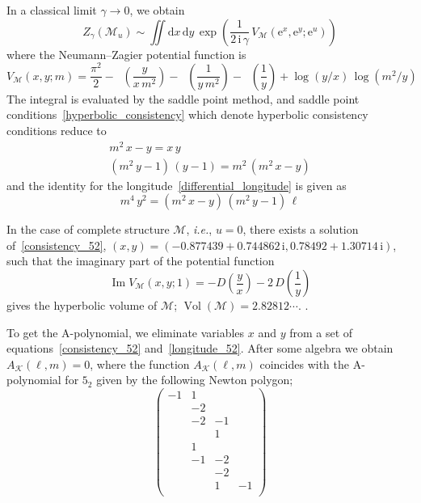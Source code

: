 \documentclass[12pt,reqno]{amsart}
\numberwithin{equation}{section}
\renewcommand{\Im}{\operatorname{Im}}
\DeclareMathOperator{\Li}{Li_2}
\DeclareMathOperator{\Vol}{Vol}
\newcommand{\I}{\mathrm{i}}
\newcommand{\E}{\mathrm{e}}
\begin{document}
In a classical limit $\gamma\to 0$, we obtain
\begin{equation}
  Z_\gamma\left( \mathcal{M}_u \right)
  \sim
  \iint \mathrm{d} x \, \mathrm{d} y \,
  \exp 
  \left(
    \frac{1}{2 \, \I \, \gamma} \,
    V_{\mathcal{M}}(\E^x, \E^y ; \E^u)
  \right)
\end{equation}
where the Neumann--Zagier potential function is
  \begin{equation}
    V_{\mathcal{M}}(x,y; m)
    =
    \frac{\pi^2}{2}
    - \Li\left(\frac{y}{x \, m^2}\right)
    - \Li \left( \frac{1}{ y \, m^2}\right)
    - \Li \left(\frac{1}{y}\right)
    + \log \left( y/x \right) \, \log \left(m^2/y \right)
  \end{equation}
The integral is evaluated by the saddle point method, and  saddle
point conditions~\eqref{hyperbolic_consistency} which denote 
hyperbolic consistency conditions
reduce to
\begin{equation}
  \label{consistency_52}
  \begin{gathered}
    m^2 \, x - y = x \, y
    \\[2mm]
    (m^2 \, y -1) \, (y -1) = m^2 \, (m^2 \, x - y)
  \end{gathered}
\end{equation}
and
the identity for the longitude~\eqref{differential_longitude} 
is given as
\begin{equation}
  \label{longitude_52}
  m^4 \, y^2 =
  (m^2 \, x - y) \, (m^2 \, y - 1) \, \ell
\end{equation}

In the case of complete structure $\mathcal{M}$, \emph{i.e.}, $u=0$,
there exists a solution of~\eqref{consistency_52},
$(x,y)=
(-0.877439 + 0.744862 \, \I ,
0.78492 + 1.30714 \, \I)$,
 such that the
imaginary part of the potential function
\begin{equation*}
  \Im V_\mathcal{M}(x,y;1)
  =
  -D \left( \frac{y}{x} \right)
  - 2 \,D\left( \frac{1}{y} \right)
\end{equation*}
gives the hyperbolic volume of $\mathcal{M}$;
$\Vol(\mathcal{M})
=
2.82812 \cdots$.
.

To get the A-polynomial, we
eliminate variables $x$ and $y$ from a set of
equations~\eqref{consistency_52} and~\eqref{longitude_52}.
After some algebra we obtain
$A_\mathcal{K}(\ell,m)=0$, where the function
$A_\mathcal{K}(\ell,m)$ coincides with the
A-polynomial for $5_2$
given by the following Newton polygon;
  \begin{equation*}
    \begin{pmatrix}
      -1 & 1 &  &  \\
       & -2 &  &  \\
       & -2 & -1 &  \\
        &  & 1 &  \\
        & 1 &  &  \\
        & -1 & -2 &  \\
        &  & -2 &  \\
        &  & 1 & -1 \\
    \end{pmatrix}
  \end{equation*}
\end{document}
